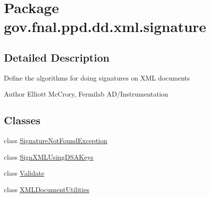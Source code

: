 \hypertarget{namespacegov_1_1fnal_1_1ppd_1_1dd_1_1xml_1_1signature}{\section{Package gov.\-fnal.\-ppd.\-dd.\-xml.\-signature}
\label{namespacegov_1_1fnal_1_1ppd_1_1dd_1_1xml_1_1signature}
}


\subsection{Detailed Description}
Define the algorithms for doing signatures on X\-M\-L documents

\begin{DoxyAuthor}{Author}
Elliott Mc\-Crory, Fermilab A\-D/\-Instrumentation 
\end{DoxyAuthor}
\subsection*{Classes}
\begin{DoxyCompactItemize}
\item 
class \hyperlink{classgov_1_1fnal_1_1ppd_1_1dd_1_1xml_1_1signature_1_1SignatureNotFoundException}{Signature\-Not\-Found\-Exception}
\item 
class \hyperlink{classgov_1_1fnal_1_1ppd_1_1dd_1_1xml_1_1signature_1_1SignXMLUsingDSAKeys}{Sign\-X\-M\-L\-Using\-D\-S\-A\-Keys}
\item 
class \hyperlink{classgov_1_1fnal_1_1ppd_1_1dd_1_1xml_1_1signature_1_1Validate}{Validate}
\item 
class \hyperlink{classgov_1_1fnal_1_1ppd_1_1dd_1_1xml_1_1signature_1_1XMLDocumentUtilities}{X\-M\-L\-Document\-Utilities}
\end{DoxyCompactItemize}
